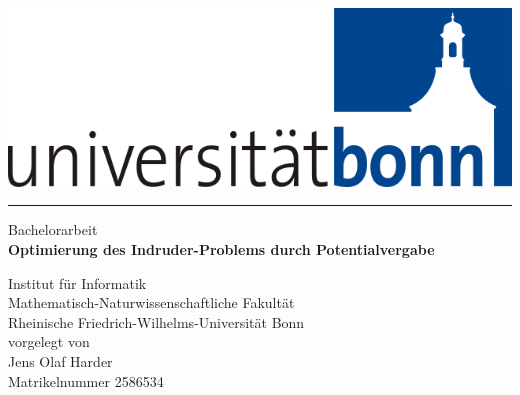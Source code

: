 
\begin{titlepage}

\renewcommand{\baselinestretch}{2}\normalsize

\begin{center}%
  \includegraphics[scale=0.3]{bilder/logo.png}
\end{center}

\rule{\textwidth}{0.4pt}

\vspace{0.2cm}

\begin{center}
    {\LARGE Bachelorarbeit} \\
    \textbf{\Huge Optimierung des Indruder-Problems durch Potentialvergabe}
\end{center}

\vspace{0.5cm}

\begin{center}

    \vspace{0.5cm}
    Institut für Informatik \\
    Mathematisch-Naturwissenschaftliche Fakultät \\
    Rheinische Friedrich-Wilhelms-Universität Bonn \\[0.5cm]
    vorgelegt von \\
    \vspace{0.5cm}
    {\Large Jens Olaf Harder} \\
    Matrikelnummer  2586534 \\
\end{center}


%
%


\end{titlepage}
